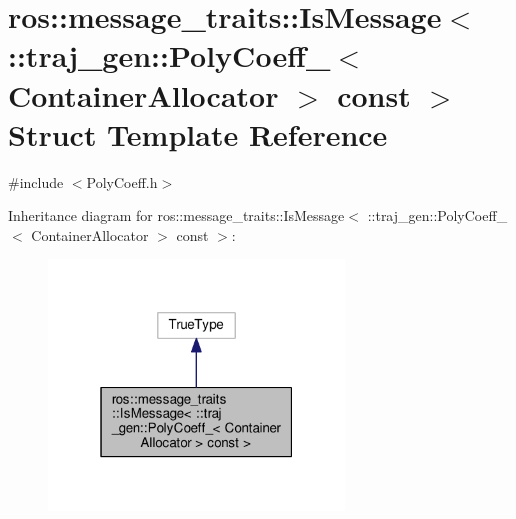 \hypertarget{structros_1_1message__traits_1_1_is_message_3_01_1_1traj__gen_1_1_poly_coeff___3_01_container_allocator_01_4_01const_01_01_4}{}\section{ros\+:\+:message\+\_\+traits\+:\+:Is\+Message$<$ \+:\+:traj\+\_\+gen\+:\+:Poly\+Coeff\+\_\+$<$ Container\+Allocator $>$ const $>$ Struct Template Reference}
\label{structros_1_1message__traits_1_1_is_message_3_01_1_1traj__gen_1_1_poly_coeff___3_01_container_allocator_01_4_01const_01_01_4}


{\ttfamily \#include $<$Poly\+Coeff.\+h$>$}



Inheritance diagram for ros\+:\+:message\+\_\+traits\+:\+:Is\+Message$<$ \+:\+:traj\+\_\+gen\+:\+:Poly\+Coeff\+\_\+$<$ Container\+Allocator $>$ const $>$\+:
\nopagebreak
\begin{figure}[H]
\begin{center}
\leavevmode
\includegraphics[width=223pt]{structros_1_1message__traits_1_1_is_message_3_01_1_1traj__gen_1_1_poly_coeff___3_01_container_ale36cc49ac5174d32d9d8749a9502d31c}
\end{center}
\end{figure}


